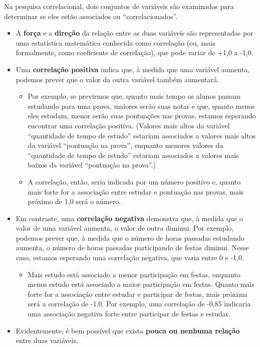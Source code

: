 \documentclass[
]{book}
\providecommand{\tightlist}{%
  \setlength{\itemsep}{0pt}\setlength{\parskip}{0pt}}
\begin{document}
Na pesquisa correlacional, dois conjuntos de variáveis são examinados para determinar se eles estão associados ou ``correlacionados''.

\begin{itemize}
\tightlist
\item
  A \textbf{força} e a \textbf{direção} da relação entre as duas variáveis são representadas por uma estatística matemática conhecida como correlação (ou, mais formalmente, como coeficiente de correlação), que pode variar de +1,0 a -1,0.
\item
  Uma \textbf{correlação positiva} indica que, à medida que uma variável aumenta, podemos prever que o valor da outra variável também aumentará.

  \begin{itemize}
  \tightlist
  \item
    Por exemplo, se previrmos que, quanto mais tempo os alunos passam estudando para uma prova, maiores serão suas notas e que, quanto menos eles estudam, menor serão suas pontuações nas provas, estamos esperando encontrar uma correlação positiva. (Valores mais altos da variável ``quantidade de tempo de estudo'' estariam associados a valores mais altos da variável ``pontuação na prova'', enquanto menores valores da ``quantidade de tempo de estudo'' estariam associados a valores mais baixos da variável ``pontuação na prova''.)
  \item
    A correlação, então, seria indicada por um número positivo e, quanto mais forte for a associação entre estudar e pontuação nas provas, mais próximo de 1,0 será o número.
  \end{itemize}
\item
  Em contraste, uma \textbf{correlação negativa} demonstra que, à medida que o valor de uma variável aumenta, o valor de outra diminui. Por exemplo, podemos prever que, à medida que o número de horas passadas estudando aumenta, o número de horas passadas participando de festas diminui. Nesse caso, estamos esperando uma correlação negativa, que varia entre 0 e -1,0.

  \begin{itemize}
  \tightlist
  \item
    Mais estudo está associado a menor participação em festas, enquanto menos estudo está associado a maior participação em festas. Quanto mais forte for a associação entre estudar e participar de festas, mais próxima será a correlação de -1,0. Por exemplo, uma correlação de -0,85 indicaria uma associação negativa forte entre participar de festas e estudar.
  \end{itemize}
\item
  Evidentemente, é bem possível que exista \textbf{pouca ou nenhuma relação} entre duas variáveis.


\end{itemize}
\end{document}
